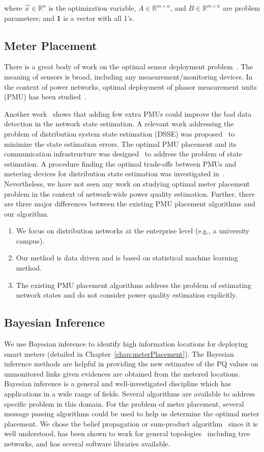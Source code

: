 where $\vec{x}\in \mathbb{R}^n$ is the optimization variable, $A \in \mathbb{R}^{m \times n}$, and $B \in \mathbb{R}^{m \times n}$ are problem parameters;  and \textbf{1} is a vector with all 1's.

\subsection{Meter Placement}
There is a great body of work on the optimal sensor deployment problem~\cite{Krause09}. The meaning of sensors is broad, including any measurement/monitoring devices. In the context of power networks, optimal deployment of phasor measurement units (PMU) has been studied~\cite{Yuill11}. 


Another work~\cite{chen2006placement} shows that adding few extra PMUs could improve the bad data detection in the network state estimation. A relevant work addressing the problem of distribution system state estimation (DSSE) was proposed~\cite{singh2011meter} to minimize the state estimation errors. The optimal PMU placement and its communication infrastructure was designed~\cite{shahraeini2012co} to address the problem of state estimation. A procedure finding the optimal trade-offs between PMUs and metering devices for distribution state estimation was investigated in~\cite{liu2012trade}. Nevertheless, we have not seen any work on studying optimal meter placement problem in the context of network-wide power quality estimation. Further, there are three major differences between the existing PMU placement algorithms and our algorithm.
\begin{enumerate}
\item We focus on distribution networks at the enterprise level (e.g., a university campus).
\item Our method is data driven and is based on statistical machine learning method.
\item The existing PMU placement algorithms address the problem of estimating network states and do not consider power quality estimation explicitly.
\end{enumerate}

\subsection{Bayesian Inference}
We use Bayesian inference to identify high information locations for deploying smart meters (detailed in Chapter~\ref{chap:meterPlacement}). The Bayesian inference methods are helpful in providing the new estimates of the PQ values on unmonitored links given evidences are obtained from the metered locations. Bayesian inference is a general and well-investigated discipline which has applications in a wide range of fields. Several algorithms are available to address specific problem in this domain. For the problem of meter placement, several message passing algorithms could be used to
help us determine the optimal meter placement. We chose the belief propagation or sum-product algorithm~\cite{pearl1988probabilistic} since it is well understood, has been shown to work for general topologies~\cite{yedidia2001generalized} including tree networks, and has several software libraries available.

